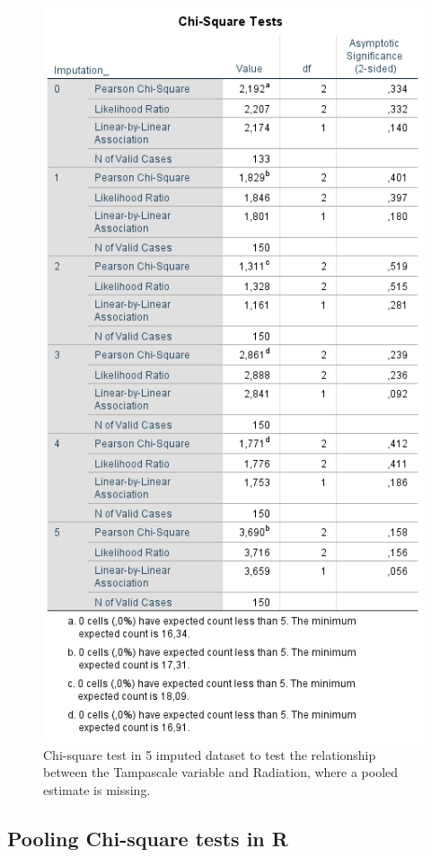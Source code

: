 \documentclass[]{book}
\begin{document}
\begin{figure}

{\centering \includegraphics[width=0.9\linewidth]{images/table5.6} 

}

\caption{Chi-square test in 5 imputed dataset to test the relationship between the Tampascale variable and Radiation, where a pooled estimate is missing.}\label{fig:tab5-6}
\end{figure}

\subsection{Pooling Chi-square tests in
R}\label{pooling-chi-square-tests-in-r}
\end{document}
